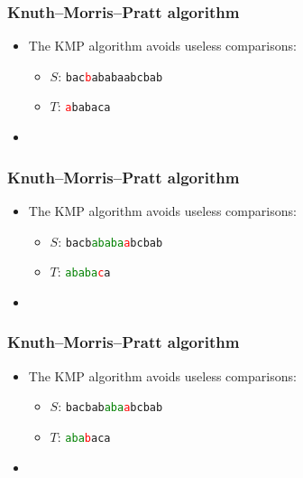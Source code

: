 \documentclass{beamer}
\begin{document}
\begin{frame}[plain]
    \frametitle{Knuth--Morris--Pratt algorithm}
    \begin{itemize}
    \item The KMP algorithm avoids useless comparisons:
        \begin{itemize}
            \item $S$: \texttt{bac\textcolor{red}{b}ababaabcbab}
            \item $T$: \texttt{\textcolor{red}{a}babaca}
        \end{itemize}
    \item[] \phantom{The number of shifts depend on which characters are currently matched}
    \end{itemize}
\end{frame}
\begin{frame}[plain]
    \frametitle{Knuth--Morris--Pratt algorithm}
    \begin{itemize}
    \item The KMP algorithm avoids useless comparisons:
        \begin{itemize}
            \item $S$: \texttt{bacb\textcolor{green}{ababa}\textcolor{red}{a}bcbab}
            \item $T$: \texttt{\textcolor{green}{ababa}\textcolor{red}{c}a}
        \end{itemize}
    \item[] \phantom{The number of shifts depend on which characters are currently matched}
    \end{itemize}
\end{frame}
\begin{frame}[plain]
    \frametitle{Knuth--Morris--Pratt algorithm}
    \begin{itemize}
    \item The KMP algorithm avoids useless comparisons:
        \begin{itemize}
            \item $S$: \texttt{bacbab\textcolor{green}{aba}\textcolor{red}{a}bcbab}
            \item $T$: \texttt{\textcolor{green}{aba}\textcolor{red}{b}aca}
        \end{itemize}
    \item[] \phantom{The number of shifts depend on which characters are currently matched}
    \end{itemize}
\end{frame}
\end{document}
